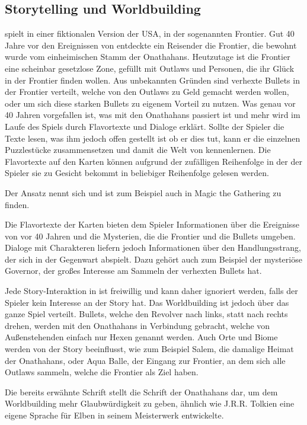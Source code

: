 \subsection{Storytelling und Worldbuilding}\label{subsec:storytellingUndWorldbuilding}

\FF spielt in einer fiktionalen Version der USA, in der sogenannten Frontier. Gut 40 Jahre vor den Ereignissen von \FF
entdeckte ein Reisender die Frontier, die bewohnt wurde vom einheimischen Stamm der Onathahans. Heutzutage ist die Frontier
eine scheinbar gesetzlose Zone, gefüllt mit Outlaws und Personen, die ihr Glück in der Frontier finden wollen.
Aus unbekannten Gründen sind verhexte Bullets in der Frontier verteilt, welche von den Outlaws zu Geld gemacht werden wollen,
oder um sich diese starken Bullets zu eigenem Vorteil zu nutzen. Was genau vor 40 Jahren vorgefallen ist, was mit den Onathahans
passiert ist und mehr wird im Laufe des Spiels durch Flavortexte und Dialoge erklärt. Sollte der Spieler die Texte lesen,
was ihm jedoch offen gestellt ist ob er dies tut, kann er die einzelnen Puzzlestücke zusammensetzen und damit die Welt von \FF kennenlernen.
Die Flavortexte auf den Karten können aufgrund der zufälligen Reihenfolge in der der Spieler sie zu Gesicht bekommt in beliebiger Reihenfolge gelesen werden.


Der Ansatz nennt sich  und ist zum Beispiel auch in Magic the Gathering zu finden.


Die Flavortexte der Karten bieten dem Spieler Informationen über die Ereignisse von vor 40 Jahren und die Mysterien,
die die Frontier und die Bullets umgeben. Dialoge mit Charakteren liefern jedoch Informationen über den Handlungsstrang,
der sich in der Gegenwart abspielt. Dazu gehört auch zum Beispiel der mysteriöse Governor, der großes Interesse am Sammeln der verhexten Bullets hat.


Jede Story-Interaktion in \FF ist freiwillig und kann daher ignoriert werden, falls der Spieler kein Interesse an der Story hat.
Das Worldbuilding ist jedoch über das ganze Spiel verteilt. Bullets, welche den Revolver nach links, statt nach rechts drehen,
werden mit den Onathahans in Verbindung gebracht, welche von Außenstehenden einfach nur Hexen genannt werden.
Auch Orte und Biome werden von der Story beeinflusst, wie zum Beispiel Salem, die damalige Heimat der Onathahans, oder Aqua Balle,
der Eingang zur Frontier, an dem sich alle Outlaws sammeln, welche die Frontier als Ziel haben.


Die bereits erwähnte Schrift stellt die Schrift der Onathahans dar, um dem Worldbuilding mehr Glaubwürdigkeit zu geben,
ähnlich wie J.R.R. Tolkien eine eigene Sprache für Elben in seinem Meisterwerk  entwickelte. 

\renewcommand{\kapitelautor}{}

